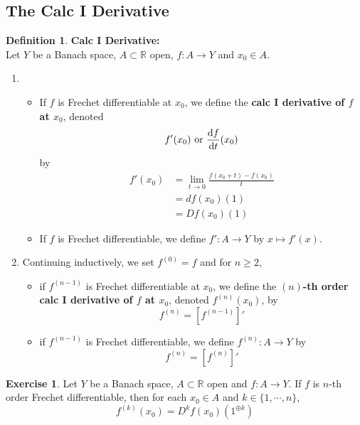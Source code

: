 \documentclass[12pt]{amsart}
\theoremstyle{definition}
\newtheorem{defn}[definition]{Definition}
\theoremstyle{remark}
\theoremstyle{definition}
\newtheorem{ex}[definition]{Exercise}
\newcommand{\R}{\mathbb{R}}
\begin{document}
	
	
	
	
	
	
	
	\newpage
	\subsection{The Calc I Derivative}
	\begin{defn}\textbf{Calc I Derivative:}\\
	Let $Y$ be a Banach space, $A \subset \R$ open, $f:A \rightarrow Y$ and $x_0 \in A$. 
	\begin{enumerate}
	\item 
	\begin{itemize}
	\item If $f$ is Frechet differentiable at $x_0$, we define the \textbf{calc I derivative of $f$ at $x_0$}, denoted $$f'(x_0) \text{ or } \dv{f}{t}{(x_0)}$$ by
	\begin{align*}
	f'(x_0) 
	&= \lim_{t \rightarrow 0} \frac{f(x_0 + t) - f(x_0)}{t} \\
	&= df(x_0)(1) \\
	&= Df(x_0)(1)
	\end{align*}
	\item If $f$ is Frechet differentiable, we define $f':A \rightarrow Y$ by $x \mapsto f'(x)$. 
	\end{itemize}
	\item Continuing inductively, we set $f^{(0)} = f$ and for $n \geq 2$,
	\begin{itemize}
	\item  if $f^{(n-1)}$ is Frechet differentiable at $x_0$, we define the \textbf{$(n)$-th order calc I derivative of $f$ at $x_0$}, denoted $f^{(n)}(x_0)$, by $$f^{(n)} = [f^{(n-1)}]'$$ 
	\item if $f^{(n-1)}$ is Frechet differentiable, we define $f^{(n)}:A \rightarrow Y$ by $$f^{(n)} = [f^{(n)}]'$$ 
	\end{itemize}
	\end{enumerate}
	\end{defn}	
	
	\begin{ex}
	Let $Y$ be a Banach space, $A \subset \R$ open and $f:A \rightarrow Y$. If $f$ is $n$-th order Frechet differentiable, then for each $x_0 \in A$ and $k \in \{1, \cdots, n\}$, $$f^{(k)}(x_0) = D^kf(x_0)(1^{\oplus k})$$
	\end{ex}
	
\end{document}
